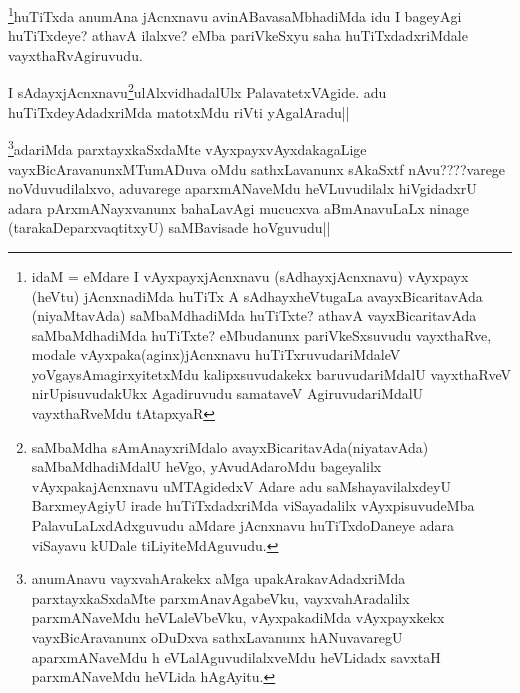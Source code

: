 \begin{artha}
\footnote{idaM = eMdare I vAyxpayxjAcnxnavu (sAdhayxjAcnxnavu) vAyxpayx (heVtu) jAcnxnadiMda huTiTx A sAdhayxheVtugaLa avayxBicaritavAda (niyaMtavAda) saMbaMdhadiMda huTiTxte? athavA vayxBicaritavAda saMbaMdhadiMda huTiTxte? eMbudanunx pariVkeSxsuvudu vayxthaRve, modale vAyxpaka(aginx)jAcnxnavu huTiTxruvudariMdaleV yoVgaysAmagirxyitetxMdu kalipxsuvudakekx baruvudariMdalU vayxthaRveV nirUpisuvudakUkx Agadiruvudu samataveV AgiruvudariMdalU vayxthaRveMdu tAtapxyaR}huTiTxda anumAna jAcnxnavu avinABavasaMbhadiMda idu I bageyAgi huTiTxdeye? athavA ilalxve? eMba pariVkeSxyu saha huTiTxdadxriMdale vayxthaRvAgiruvudu.
\end{artha}

\begin{artha}
I sAdayxjAcnxnavu\footnote{saMbaMdha sAmAnayxriMdalo avayxBicaritavAda(niyatavAda) saMbaMdhadiMdalU heVgo, yAvudAdaroMdu bageyalilx vAyxpakajAcnxnavu uMTAgidedxV Adare adu saMshayavilalxdeyU BarxmeyAgiyU irade huTiTxdadxriMda viSayadalilx vAyxpisuvudeMba  PalavuLaLxdAdxguvudu aMdare jAcnxnavu huTiTxdoDaneye adara viSayavu kUDale tiLiyiteMdAguvudu.}ulAlxvidhadalUlx PalavatetxVAgide. adu huTiTxdeyAdadxriMda matotxMdu riVti yAgalAradu||
\end{artha}

\begin{artha}
\footnote{anumAnavu vayxvahArakekx aMga upakArakavAdadxriMda parxtayxkaSxdaMte parxmAnavAgabeVku, vayxvahAradalilx parxmANaveMdu heVLaleVbeVku, vAyxpakadiMda vAyxpayxkekx vayxBicAravanunx oDuDxva sathxLavanunx hANuvavaregU aparxmANaveMdu h eVLalAguvudilalxveMdu heVLidadx savxtaH parxmANaveMdu heVLida hAgAyitu.}adariMda parxtayxkaSxdaMte vAyxpayxvAyxdakagaLige vayxBicAravanunxMTumADuva oMdu sathxLavanunx sAkaSxtf nAvu????varege noVduvudilalxvo, aduvarege aparxmANaveMdu heVLuvudilalx hiVgidadxrU adara pArxmANayxvanunx bahaLavAgi mucucxva aBmAnavuLaLx ninage (tarakaDeparxvaqtitxyU) saMBavisade hoVguvudu||
\end{artha}

